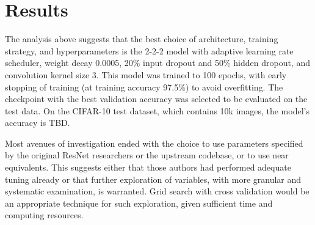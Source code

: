 \documentclass[letterpaper]{article} %
\begin{document}
\section{Results}

The analysis above suggests that the best choice of architecture, training strategy, and hyperparameters is the 2-2-2
model with adaptive learning rate scheduler, weight decay 0.0005, 20\% input dropout and 50\% hidden dropout, and
convolution kernel size 3.
This model was trained to 100 epochs, with early stopping of training (at training accuracy 97.5\%) to avoid overfitting.
The checkpoint with the best validation accuracy was selected to be evaluated on the test data.
On the CIFAR-10 test dataset, which contains 10k images, the model's accuracy is TBD.

Most avenues of investigation ended with the choice to use parameters specified by the original ResNet researchers or
the upstream codebase, or to use near equivalents.
This suggests either that those authors had performed adequate tuning already or that further exploration of variables,
with more granular and systematic examination, is warranted.
Grid search with cross validation would be an appropriate technique for such exploration, given sufficient time and
computing resources.


\end{document}

